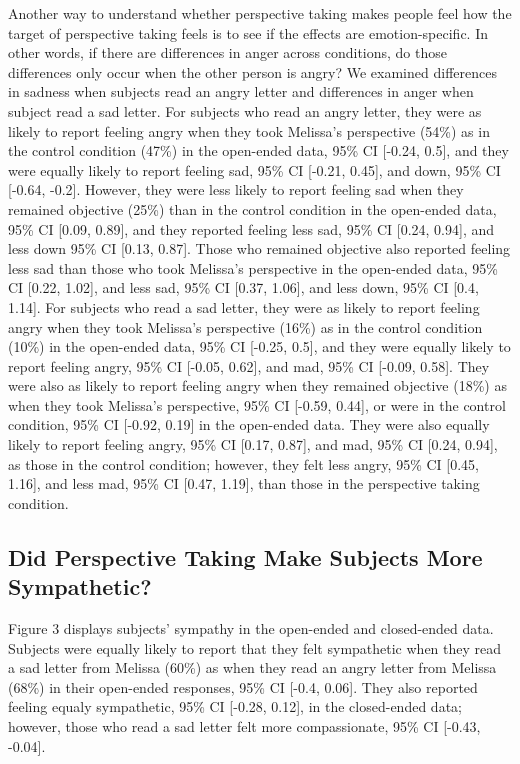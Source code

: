 \documentclass[man,a4paper,noextraspace,apacite]{apa6}\usepackage[]{graphicx}\usepackage[]{color}
\begin{document}
Another way to understand whether perspective taking makes people feel how the target of perspective taking feels is to see if the effects are emotion-specific. In other words, if there are differences in anger across conditions, do those differences only occur when the other person is angry? We examined differences in sadness when subjects read an angry letter and differences in anger when subject read a sad letter.
    For subjects who read an angry letter, they were as likely to report feeling angry when they took Melissa's perspective (54\%) as in the control condition (47\%) in the open-ended data, 95\% CI [-0.24, 0.5], and they were equally likely to report feeling sad, 95\% CI [-0.21, 0.45], and down, 95\% CI [-0.64, -0.2]. However, they were less likely to report feeling sad when they remained objective (25\%) than in the control condition in the open-ended data, 95\% CI [0.09, 0.89], and they reported feeling less sad, 95\% CI [0.24, 0.94], and less down 95\% CI [0.13, 0.87]. Those who remained objective also reported feeling less sad than those who took Melissa's perspective in the open-ended data, 95\% CI [0.22, 1.02], and less sad, 95\% CI [0.37, 1.06], and less down, 95\% CI [0.4, 1.14].
    For subjects who read a sad letter, they were as likely to report feeling angry when they took Melissa's perspective (16\%) as in the control condition (10\%) in the open-ended data, 95\% CI [-0.25, 0.5], and they were equally likely to report feeling angry, 95\% CI [-0.05, 0.62], and mad, 95\% CI [-0.09, 0.58]. They were also as likely to report feeling angry when they remained objective (18\%) as when they took Melissa's perspective, 95\% CI [-0.59, 0.44], or were in the control condition, 95\% CI [-0.92, 0.19] in the open-ended data. They were also equally likely to report feeling angry, 95\% CI [0.17, 0.87], and mad, 95\% CI [0.24, 0.94], as those in the control condition; however, they felt less angry, 95\% CI [0.45, 1.16], and less mad, 95\% CI [0.47, 1.19], than those in the perspective taking condition.

\subsection{Did Perspective Taking Make Subjects More Sympathetic?}


Figure 3 displays subjects' sympathy in the open-ended and closed-ended data. 
    Subjects were equally likely to report that they felt sympathetic when they read a sad letter from Melissa (60\%) as when they read an angry letter from Melissa (68\%) in their open-ended responses, 95\% CI [-0.4, 0.06]. They also reported feeling equaly sympathetic, 95\% CI [-0.28, 0.12], in the closed-ended data; however, those who read a sad letter felt more compassionate, 95\% CI [-0.43, -0.04].
    
\end{document}
